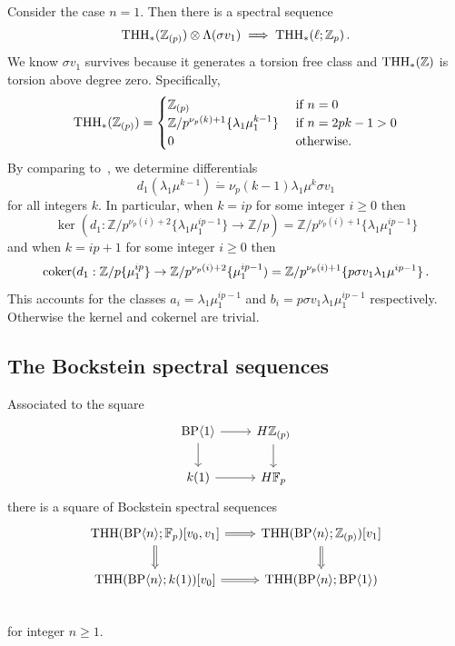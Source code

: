 \begin{example}
Consider the case $n=1$. Then there is a spectral sequence 
\[ 
\operatorname{THH}_{*}(\mathbb{Z}_{(p)})\otimes \Lambda (\sigma v_{1})\implies \operatorname{THH}_{*}(\ell;\mathbb{Z}_{p}) \,.
\]
We know $\sigma v_1$ survives because it generates a torsion free class and $\operatorname{THH}_*(\mathbb{Z})$ is torsion above degree zero. Specifically, 
\[
\operatorname{THH}_*(\mathbb{Z}_{(p)})=\begin{cases} \mathbb{Z}_{(p)} & \text{ if } n=0 \\ 
\mathbb{Z}/p^{\nu_p(k)+1}\{\lambda_1\mu_1^{k-1}\} & \text{ if } n=2pk-1>0 \\ 
0 & \text{ otherwise.}
\end{cases}
\]
By comparing to~\cite{AHL}, we determine differentials 
\[
d_1(\lambda_1\mu^{k-1})\dot{=}\nu_p(k-1)\lambda_1\mu^{k}\sigma v_1 
\]
for all integers $k$. In particular, when $k=ip$ for some integer $i\ge 0$ then 
\[ 
\ker 
(d_1 :\mathbb{Z}/p^{\nu_p(i)+2}\{\lambda_1\mu_1^{ip-1}\}\to \mathbb{Z}/p) = \mathbb{Z}/p^{\nu_p(i)+1}\{\lambda_1\mu_1^{ip-1}\}
\]
and when $k=ip+1$ for some integer $i\ge 0$ then 
\[ 
\textup{coker} 
(d_1 :\mathbb{Z}/p\{\mu_1^{ip}\}\to \mathbb{Z}/p^{\nu_p(i)+2}\{\mu_1^{ip-1}) = \mathbb{Z}/p^{\nu_p(i)+1}\{p\sigma v_1\lambda_1\mu^{ip-1}\} \,.
\]
This accounts for the classes $a_i=\lambda_1\mu_1^{ip-1}$ and $b_i=p\sigma v_1\lambda_1\mu_1^{ip-1}$ respectively. Otherwise the kernel and cokernel are trivial. 
\end{example}


\subsection{The Bockstein spectral sequences}

Associated to the square 
\[
\begin{tikzcd}
\BP\langle 1\rangle \ar[r] \ar[d] & H\mathbb{Z}_{(p)} \ar[d] \\ 
k(1) \ar[r] & H\mathbb{F}_p
\end{tikzcd}
\]
there is a square of Bockstein spectral sequences \[
\begin{tikzcd}
\THH(\BP\langle n \rangle ;\mathbb{F}_p)[v_0,v_1]\arrow[Rightarrow]{r} \arrow[Rightarrow]{d} &  \THH(\BP\langle n\rangle ;\mathbb{Z}_{(p)})[v_1]\arrow[Rightarrow]{d}\\ 
\THH(\BP\langle n\rangle ;k(1))[v_0]\arrow[Rightarrow]{r}  &  \THH(\BP\langle n \rangle ;\BP\langle 1\rangle) \\ 
\end{tikzcd}
\]
for integer $n\ge 1$. 

